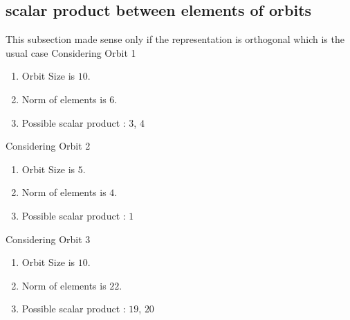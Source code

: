 \documentclass[12pt]{article}
\begin{document}
\subsection{scalar product between elements of orbits}
\noindent This subsection made sense only if the representation is orthogonal which is the usual case
Considering Orbit 1
\begin{enumerate}
\item Orbit Size is $10$.
\item Norm of elements is $6$.
\item Possible scalar product : $3$, $4$
\end{enumerate}
Considering Orbit 2
\begin{enumerate}
\item Orbit Size is $5$.
\item Norm of elements is $4$.
\item Possible scalar product : $1$
\end{enumerate}
Considering Orbit 3
\begin{enumerate}
\item Orbit Size is $10$.
\item Norm of elements is $22$.
\item Possible scalar product : $19$, $20$
\end{enumerate}
\end{document}

